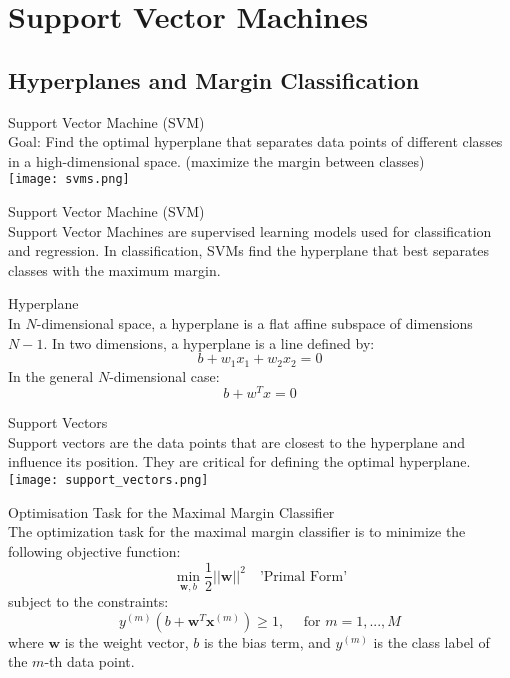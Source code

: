 \section{Support Vector Machines}

\subsection{Hyperplanes and Margin Classification}

\begin{definition}{Support Vector Machine (SVM)}\\
    Goal: Find the optimal hyperplane that separates data points of different classes in a high-dimensional space. (maximize the margin between classes)\\
    \texttt{[image: svms.png]}
\end{definition}

\begin{definition}{Support Vector Machine (SVM)}\\
Support Vector Machines are supervised learning models used for classification and regression. In classification, SVMs find the hyperplane that best separates classes with the maximum margin.
\end{definition}

\begin{definition}{Hyperplane}\\
In $N$-dimensional space, a hyperplane is a flat affine subspace of dimensions $N-1$. In two dimensions, a hyperplane is a line defined by:
\[b + w_1 x_1 + w_2 x_2 = 0\]
In the general $N$-dimensional case:
\[b + w^T x = 0\]
\end{definition}

\begin{definition}{Support Vectors}\\
    Support vectors are the data points that are closest to the hyperplane and influence its position. They are critical for defining the optimal hyperplane.\\
    \texttt{[image: support\_vectors.png]}
\end{definition}

\begin{concept}{Optimisation Task for the Maximal Margin Classifier}\\
    The optimization task for the maximal margin classifier is to minimize the following objective function:
    \[ \min_{\mathbf{w}, b} \frac{1}{2} ||\mathbf{w}||^2 \quad \text{'Primal Form'}\]
    subject to the constraints:
    \[ y^{(m)} (b + \mathbf{w}^T \mathbf{x}^{(m)}) \geq 1, \quad \text{ for } m = 1,..., M \]
    where $\mathbf{w}$ is the weight vector, $b$ is the bias term, and $y^{(m)}$ is the class label of the $m$-th data point.
\end{concept}

